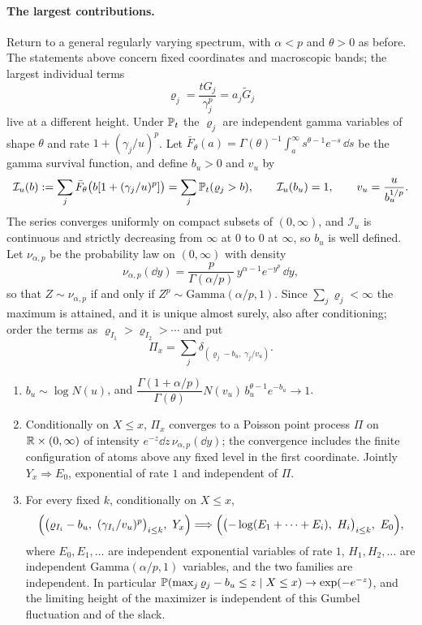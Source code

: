 \paragraph{The largest contributions.}
Return to a general regularly varying spectrum, with $\alpha<p$ and $\theta>0$ as before. The
statements above concern fixed coordinates and macroscopic bands; the largest individual terms
\[
 \varrho_j=\frac{tG_j}{\gamma_j^p}=a_j\widetilde G_j
\]
live at a different height. Under $\mathbb{P}_t$ the $\varrho_j$ are independent gamma variables of shape
$\theta$ and rate $1+(\gamma_j/u)^p$. Let $\bar F_\theta(a)=\Gamma(\theta)^{-1}\int_a^\infty s^{\theta-1}e^{-s}\,\dd s$
be the gamma survival function, and define $b_u>0$ and $v_u$ by
\begin{equation}\label{ana:eq:extcentre}
 \mathcal I_u(b):=\sum_j\bar F_\theta\bigl(b[1+(\gamma_j/u)^p]\bigr)=\sum_j\mathbb{P}_t(\varrho_j>b),\qquad
 \mathcal I_u(b_u)=1,\qquad v_u=\frac u{b_u^{1/p}} .
\end{equation}
The series converges uniformly on compact subsets of $(0,\infty)$, and $\mathcal I_u$ is continuous and
strictly decreasing from $\infty$ at $0$ to $0$ at $\infty$, so $b_u$ is well defined. Let
$\nu_{\alpha,p}$ be the probability law on $(0,\infty)$ with density
\[
 \nu_{\alpha,p}(\dd y)=\frac p{\Gamma(\alpha/p)}\,y^{\alpha-1}e^{-y^p}\,\dd y ,
\]
so that $Z\sim\nu_{\alpha,p}$ if and only if $Z^p\sim\mathrm{Gamma}(\alpha/p,1)$. Since
$\sum_j\varrho_j<\infty$ the maximum is attained, and it is unique almost surely, also after
conditioning; order the terms as $\varrho_{I_1}>\varrho_{I_2}>\cdots$ and put
\[
 \Pi_x=\sum_j\delta_{(\varrho_j-b_u,\ \gamma_j/v_u)} .
\]

\begin{theorem}\label{ana:thm:extremes}
\begin{enumerate}[label=\textup{(\roman*)}]
\item $b_u\sim\log N(u)$, and $\dfrac{\Gamma(1+\alpha/p)}{\Gamma(\theta)}N(v_u)\,b_u^{\theta-1}e^{-b_u}\to1$.
\item Conditionally on $X\le x$, $\Pi_x$ converges to a Poisson point process $\Pi$ on
 $\mathbb{R}\times(0,\infty)$ of intensity $e^{-z}\dd z\,\nu_{\alpha,p}(\dd y)$; the convergence includes the
 finite configuration of atoms above any fixed level in the first coordinate. Jointly $Y_x\Rightarrow E_0$,
 exponential of rate $1$ and independent of $\Pi$.
\item For every fixed $k$, conditionally on $X\le x$,
\[
 \Bigl(\bigl(\varrho_{I_i}-b_u,\ (\gamma_{I_i}/v_u)^p\bigr)_{i\le k},\ Y_x\Bigr)\Longrightarrow
 \Bigl(\bigl(-\log(E_1+\dots+E_i),\ H_i\bigr)_{i\le k},\ E_0\Bigr),
\]
 where $E_0,E_1,\dots$ are independent exponential variables of rate $1$, $H_1,H_2,\dots$ are independent
 $\mathrm{Gamma}(\alpha/p,1)$ variables, and the two families are independent. In particular
 $\mathbb{P}(\max_j\varrho_j-b_u\le z\mid X\le x)\to\exp(-e^{-z})$, and the limiting height of the maximizer
 is independent of this Gumbel fluctuation and of the slack.
\end{enumerate}
\end{theorem}

